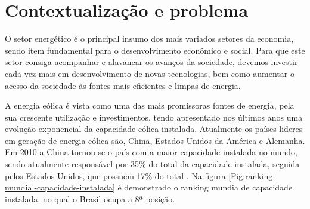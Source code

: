 
\label{Cap:fundamentacao}

\section{Contextualização e problema}
\label{contextualização}






O setor energético é o principal insumo dos mais variados setores da economia, sendo item fundamental para o desenvolvimento econômico e social. Para que este setor consiga acompanhar e alavancar os avanços da sociedade, devemos investir cada vez mais em desenvolvimento de novas tecnologias, bem como aumentar o acesso da sociedade às fontes mais eficientes e limpas de energia.

A energia eólica é vista como uma das mais promissoras fontes de energia, pela sua crescente utilização e investimentos, tendo apresentado nos últimos anos uma evolução exponencial da capacidade eólica instalada. Atualmente os países lideres em geração de energia eólica são, China, Estados Unidos da América e Alemanha. Em 2010 a China tornou-se o país com a maior capacidade instalada no mundo, sendo atualmente responsável por 35\% do total da capacidade instalada, seguida pelos Estados Unidos, que possuem 17\% do total \cite{global-wind-energy}. Na figura \ref{Fig:ranking-mundial-capacidade-instalada} é demonstrado o ranking mundia de capacidade instalada, no qual o Brasil ocupa a 8ª posição.

